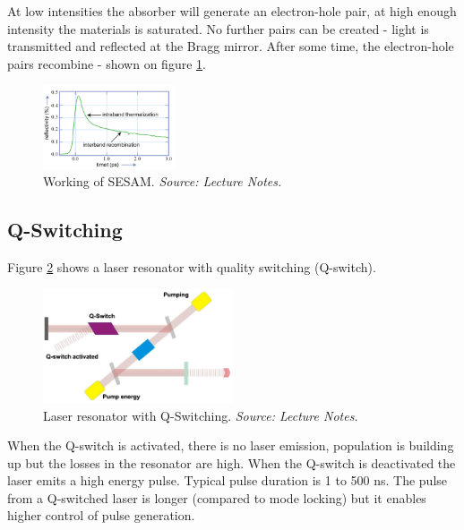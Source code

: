 At low intensities the absorber will generate an electron-hole pair, at high enough intensity the materials is saturated. 
No further pairs can be created - light is transmitted and reflected at the Bragg mirror. After some time, the electron-hole pairs
recombine - shown on figure \ref{fig:sesam2}.
\begin{figure}[h!]
    \centering
    \includegraphics[width=0.35\textwidth]{slike/sesam2.png}
    \caption{Working of SESAM. \textit{Source: Lecture Notes.}}
    \label{fig:sesam2}
\end{figure}

\subsection{Q-Switching}

Figure \ref{fig:qswitching} shows a laser resonator with quality switching (Q-switch).
\begin{figure}[h!]
    \centering
    \includegraphics[width=0.5\textwidth]{slike/qswitching.png}
    \caption{Laser resonator with Q-Switching. \textit{Source: Lecture Notes.}}
    \label{fig:qswitching}
\end{figure}

When the Q-switch is activated, there is no laser emission, population is building up but the losses in the resonator are high.
When the Q-switch is deactivated the laser emits a high energy pulse. Typical pulse duration is 1 to 500 ns. 
The pulse from a Q-switched laser is longer (compared to mode locking) but it enables higher control of pulse generation.
